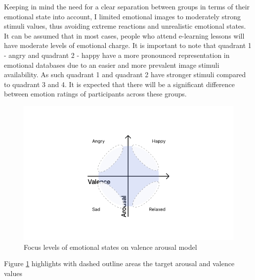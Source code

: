 Keeping in mind the need for a clear separation between groups in terms of their emotional state into account, I limited emotional images to moderately strong stimuli values, thus avoiding extreme reactions and unrealistic emotional states. It can be assumed that in most cases, people who attend e-learning lessons will have moderate levels of emotional charge. It is important to note that quadrant 1 - angry and quadrant 2 - happy have a more pronounced representation in emotional databases due to an easier and more prevalent image stimuli availability. As such quadrant 1 and quadrant 2 have stronger stimuli compared to quadrant 3 and 4. It is expected that there will be a significant difference between emotion ratings of participants across these groups.



\begin{figure}
	\centering
	\includegraphics[width=0.7\linewidth]{graphics/Valence-Arousal-Model-1.png}
	\caption{Focus levels of emotional states on valence arousal model}
	\label{fig:valence-arousal-model-2}
\end{figure}

Figure \ref{fig:valence-arousal-model-2} highlights with dashed outline areas the target arousal and valence values


